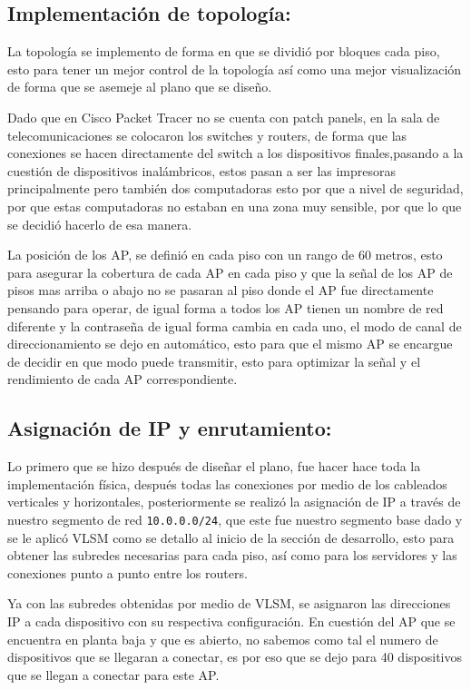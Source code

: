 \documentclass[letterpaper,11pt]{article}
\begin{document}
    \subsection{Implementación de topología:}

    La topología se implemento de forma en que se dividió por bloques cada piso, esto para tener un mejor control de la topología así como una mejor visualización de forma que se asemeje al plano que se diseño.

    Dado que en Cisco Packet Tracer no se cuenta con patch panels, en la sala de telecomunicaciones se colocaron los switches y routers, de forma que las conexiones se hacen directamente del switch a los dispositivos finales,pasando a la cuestión de dispositivos inalámbricos, estos pasan a ser las impresoras principalmente pero también dos computadoras esto por que a nivel de seguridad, por que estas computadoras no estaban en una zona muy sensible, por que lo que se decidió hacerlo de esa manera.

    La posición de los AP, se definió en cada piso con un rango de 60 metros, esto para asegurar la cobertura de cada AP en cada piso y que la señal de los AP de pisos mas arriba o abajo no se pasaran al piso donde el AP fue directamente pensando para operar, de igual forma a todos los AP tienen un nombre de red diferente y la contraseña de igual forma cambia en cada uno, el modo 
    de canal de direccionamiento se dejo en automático, esto para que el mismo AP 
    se encargue de decidir en que modo puede transmitir, esto para optimizar la señal y el rendimiento de cada AP correspondiente.
    
    \subsection{Asignación de IP y enrutamiento:}

    Lo primero que se hizo después de diseñar el plano, fue hacer hace toda la implementación física, después todas las conexiones por medio de los cableados verticales y horizontales,
    posteriormente se realizó la asignación de IP a través de nuestro segmento de red \texttt{10.0.0.0/24}, que este fue nuestro segmento base dado y se le aplicó VLSM como se detallo al inicio de la sección de desarrollo, esto para obtener las subredes necesarias para cada piso, así como para los servidores y las conexiones punto a punto entre los routers.

    Ya con las subredes obtenidas por medio de VLSM, se asignaron las direcciones IP a cada dispositivo con su respectiva configuración. En cuestión del AP que se encuentra en planta baja y que es abierto, no sabemos como tal el numero de dispositivos que se llegaran a conectar, es por eso que se dejo para 40 dispositivos que se llegan a conectar para este AP.
\end{document}
